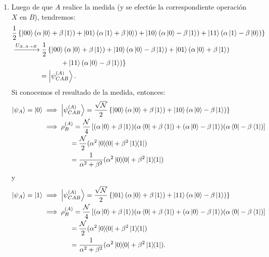 \documentclass{scrartcl}
\newcommand{\inv}[1]{\frac{1}{#1}}
\DeclareRobustCommand{\[}{\begin{equation}}
\DeclareRobustCommand{\]}{\end{equation}}
\begin{document}
\begin{enumerate}
\begin{enumerate}
        \item Luego de que $A$ realice la medida (y se efectúe la correspondiente operación $X$ en $B$), tendremos:
        \begin{align}
            &\inv{2} \left\{ \ket{00} (\alpha \ket{0} + \beta \ket{1}) + \ket{01} (\alpha \ket{1} + \beta \ket{0}) + \ket{10} (\alpha \ket{0} - \beta \ket{1}) + \ket{11} (\alpha \ket{1} - \beta \ket{0}) \right\} \\
                &\xrightarrow[]{U_{X, A \to B}} \inv{2} \left\{ \ket{00} (\alpha \ket{0} + \beta \ket{1}) + \ket{10} (\alpha \ket{0} - \beta \ket{1}) + \ket{01} (\alpha \ket{0} + \beta \ket{1}) \right. \\
                &\quad \quad \quad \quad \quad \quad \quad \left. + \ket{11} (\alpha \ket{0} - \beta \ket{1}) \right\} \\
                &\quad \quad \quad \quad = \ket{\psi^{(A)}_{CAB}}.
        \end{align}
        Si conocemos el resultado de la medida, entonces:
        \begin{align}
            \ket{\psi_{A}} = \ket{0} &\implies \ket{\psi^{(A)}_{CAB}} = \frac{\sqrt{\mathcal{N}}}{2} \left\{ \ket{00} (\alpha \ket{0} + \beta \ket{1}) + \ket{10} (\alpha \ket{0} - \beta \ket{1}) \right\} \\
                &\implies \rho^{(A)}_B = \frac{\mathcal{N}}{4} \left[ (\alpha \ket{0} + \beta \ket{1}) (\alpha \bra{0} + \beta \bra{1}) + (\alpha \ket{0} - \beta \ket{1}) (\alpha \bra{0} - \beta \bra{1})\right] \\
                &\quad \quad \quad \quad =\frac{\mathcal{N}}{2} (\alpha^2 \dyad{0}{0} + \beta^2 \dyad{1}{1}) \\
                &\quad \quad \quad \quad =\frac{1}{\alpha^2 + \beta^2} (\alpha^2 \dyad{0}{0} + \beta^2 \dyad{1}{1})
        \end{align}
        y
        \begin{align}
            \ket{\psi_{A}} = \ket{1} &\implies \ket{\psi^{(A)}_{CAB}} = \frac{\sqrt{\mathcal{N}}}{2} \left\{ \ket{01} (\alpha \ket{0} + \beta \ket{1}) + \ket{11} (\alpha \ket{0} - \beta \ket{1}) \right\} \\
                &\implies \rho^{(A)}_B = \frac{\mathcal{N}}{4} \left[ (\alpha \ket{0} + \beta \ket{1}) (\alpha \bra{0} + \beta \bra{1}) + (\alpha \ket{0} - \beta \ket{1}) (\alpha \bra{0} - \beta \bra{1})\right] \\
                &\quad \quad \quad \quad =\frac{\mathcal{N}}{2} (\alpha^2 \dyad{0}{0} + \beta^2 \dyad{1}{1}) \\
                &\quad \quad \quad \quad =\frac{1}{\alpha^2 + \beta^2} (\alpha^2 \dyad{0}{0} + \beta^2 \dyad{1}{1}).
        \end{align}
        

\end{enumerate}
\end{enumerate}
\end{document}
